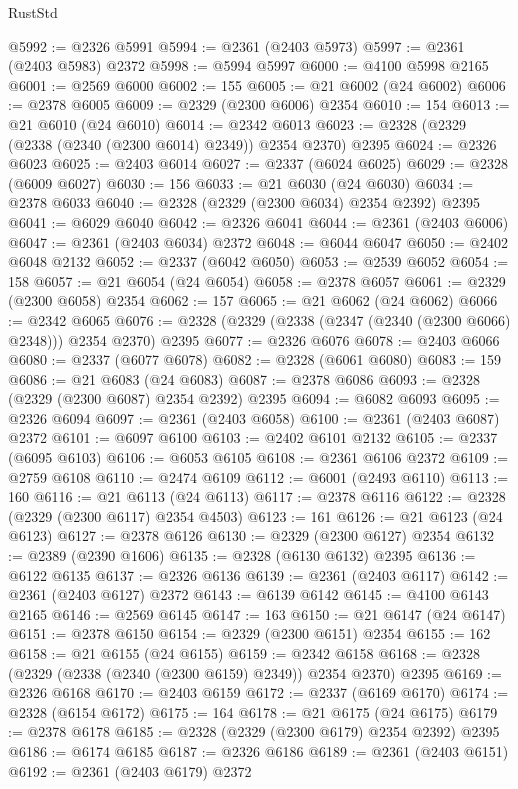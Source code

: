 \begin{lexlean}{RustStd}
\begin{coremodule}
{\begin{coremodule}
{{{{{{{{{{{{{{{{{{{{{{{{{{{{{{{{{{{{{@5992 := @2326 @5991
@5994 := @2361 (@2403 @5973)
@5997 := @2361 (@2403 @5983) @2372
@5998 := @5994 @5997
@6000 := @4100 @5998 @2165
@6001 := @2569 @6000
@6002 := 155
@6005 := @21 @6002 (@24 @6002)
@6006 := @2378 @6005
@6009 := @2329 (@2300 @6006) @2354
@6010 := 154
@6013 := @21 @6010 (@24 @6010)
@6014 := @2342 @6013
@6023 := @2328 (@2329 (@2338 (@2340 (@2300 @6014) @2349)) @2354 @2370) @2395
@6024 := @2326 @6023
@6025 := @2403 @6014
@6027 := @2337 (@6024 @6025)
@6029 := @2328 (@6009 @6027)
@6030 := 156
@6033 := @21 @6030 (@24 @6030)
@6034 := @2378 @6033
@6040 := @2328 (@2329 (@2300 @6034) @2354 @2392) @2395
@6041 := @6029 @6040
@6042 := @2326 @6041
@6044 := @2361 (@2403 @6006)
@6047 := @2361 (@2403 @6034) @2372
@6048 := @6044 @6047
@6050 := @2402 @6048 @2132
@6052 := @2337 (@6042 @6050)
@6053 := @2539 @6052
@6054 := 158
@6057 := @21 @6054 (@24 @6054)
@6058 := @2378 @6057
@6061 := @2329 (@2300 @6058) @2354
@6062 := 157
@6065 := @21 @6062 (@24 @6062)
@6066 := @2342 @6065
@6076 := @2328 (@2329 (@2338 (@2347 (@2340 (@2300 @6066) @2348))) @2354 @2370) @2395
@6077 := @2326 @6076
@6078 := @2403 @6066
@6080 := @2337 (@6077 @6078)
@6082 := @2328 (@6061 @6080)
@6083 := 159
@6086 := @21 @6083 (@24 @6083)
@6087 := @2378 @6086
@6093 := @2328 (@2329 (@2300 @6087) @2354 @2392) @2395
@6094 := @6082 @6093
@6095 := @2326 @6094
@6097 := @2361 (@2403 @6058)
@6100 := @2361 (@2403 @6087) @2372
@6101 := @6097 @6100
@6103 := @2402 @6101 @2132
@6105 := @2337 (@6095 @6103)
@6106 := @6053 @6105
@6108 := @2361 @6106 @2372
@6109 := @2759 @6108
@6110 := @2474 @6109
@6112 := @6001 (@2493 @6110)
@6113 := 160
@6116 := @21 @6113 (@24 @6113)
@6117 := @2378 @6116
@6122 := @2328 (@2329 (@2300 @6117) @2354 @4503)
@6123 := 161
@6126 := @21 @6123 (@24 @6123)
@6127 := @2378 @6126
@6130 := @2329 (@2300 @6127) @2354
@6132 := @2389 (@2390 @1606)
@6135 := @2328 (@6130 @6132) @2395
@6136 := @6122 @6135
@6137 := @2326 @6136
@6139 := @2361 (@2403 @6117)
@6142 := @2361 (@2403 @6127) @2372
@6143 := @6139 @6142
@6145 := @4100 @6143 @2165
@6146 := @2569 @6145
@6147 := 163
@6150 := @21 @6147 (@24 @6147)
@6151 := @2378 @6150
@6154 := @2329 (@2300 @6151) @2354
@6155 := 162
@6158 := @21 @6155 (@24 @6155)
@6159 := @2342 @6158
@6168 := @2328 (@2329 (@2338 (@2340 (@2300 @6159) @2349)) @2354 @2370) @2395
@6169 := @2326 @6168
@6170 := @2403 @6159
@6172 := @2337 (@6169 @6170)
@6174 := @2328 (@6154 @6172)
@6175 := 164
@6178 := @21 @6175 (@24 @6175)
@6179 := @2378 @6178
@6185 := @2328 (@2329 (@2300 @6179) @2354 @2392) @2395
@6186 := @6174 @6185
@6187 := @2326 @6186
@6189 := @2361 (@2403 @6151)
@6192 := @2361 (@2403 @6179) @2372
}}}}}}}}}}}}}}}}}}}}}}}}}}}}}}}}}}}}}
\end{coremodule}}
\end{coremodule}
\end{lexlean}
